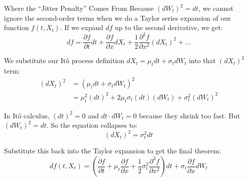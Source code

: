 \documentclass{beamer}
\begin{document}
\begin{frame}{Where the ``Jitter Penalty'' Comes From}
Because $(dW_t)^2 = dt$, we cannot ignore the second-order terms when we do a Taylor series expansion of our function $f(t, X_t)$.
If we expand $df$ up to the second derivative, we get:
\[ df = \frac{\partial f}{\partial t}dt + \frac{\partial f}{\partial x}dX_t + \frac{1}{2}\frac{\partial^2 f}{\partial x^2}(dX_t)^2 + \dots \]

We substitute our It\^o process definition $dX_t = \mu_t dt + \sigma_t dW_t$ into that $(dX_t)^2$ term:
\begin{align*}
(dX_t)^2 &= (\mu_t dt + \sigma_t dW_t)^2 \\
         &= \mu_t^2(dt)^2 + 2\mu_t\sigma_t(dt)(dW_t) + \sigma_t^2(dW_t)^2
\end{align*}
\end{frame}

\begin{frame}
In It\^o calculus, $(dt)^2 = 0$ and $dt \cdot dW_t = 0$ because they shrink too fast. But $(dW_t)^2 = dt$. So the equation collapses to:
\[ (dX_t)^2 = \sigma_t^2 dt \]

Substitute this back into the Taylor expansion to get the final theorem:
\[ df(t, X_t) = \left( \frac{\partial f}{\partial t} + \mu_t \frac{\partial f}{\partial x} + \frac{1}{2}\sigma_t^2 \frac{\partial^2 f}{\partial x^2} \right) dt + \sigma_t \frac{\partial f}{\partial x} dW_t \]
\end{frame}
\end{document}
